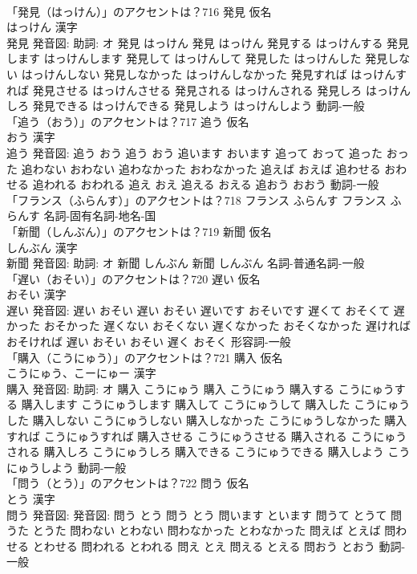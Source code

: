 \documentclass[8pt]{extreport}
\begin{document}
\begin{CJK}{UTF8}{min}
\\	「発見（はっけん）」のアクセントは？716	発見 仮名　
\\	はっけん 漢字　
\\	発見 発音図: 助詞: オ	発見 はっけん		発見 はっけん 発見する はっけんする 発見します はっけんします 発見して はっけんして 発見した はっけんした 発見しない はっけんしない 発見しなかった はっけんしなかった 発見すれば はっけんすれば 発見させる はっけんさせる 発見される はっけんされる 発見しろ はっけんしろ 発見できる はっけんできる 発見しよう はっけんしよう				動詞-一般 
\\	「追う（おう）」のアクセントは？717	追う 仮名　
\\	おう 漢字　
\\	追う 発音図:	追う おう		追う おう 追います おいます 追って おって 追った おった 追わない おわない 追わなかった おわなかった 追えば おえば 追わせる おわせる 追われる おわれる 追え おえ 追える おえる 追おう おおう				動詞-一般 
\\	「フランス（ふらんす）」のアクセントは？718		フランス ふらんす		フランス ふらんす				名詞-固有名詞-地名-国 
\\	「新聞（しんぶん）」のアクセントは？719	新聞 仮名　
\\	しんぶん 漢字　
\\	新聞 発音図: 助詞: オ	新聞 しんぶん		新聞 しんぶん				名詞-普通名詞-一般 
\\	「遅い（おそい）」のアクセントは？720	遅い 仮名　
\\	おそい 漢字　
\\	遅い 発音図:	遅い おそい		遅い おそい 遅いです おそいです 遅くて おそくて 遅かった おそかった 遅くない おそくない 遅くなかった おそくなかった 遅ければ おそければ 遅い おそい おそい 遅く おそく				形容詞-一般 
\\	「購入（こうにゅう）」のアクセントは？721	購入 仮名　
\\	こうにゅう、こーにゅー 漢字　
\\	購入 発音図: 助詞: オ	購入 こうにゅう		購入 こうにゅう 購入する こうにゅうする 購入します こうにゅうします 購入して こうにゅうして 購入した こうにゅうした 購入しない こうにゅうしない 購入しなかった こうにゅうしなかった 購入すれば こうにゅうすれば 購入させる こうにゅうさせる 購入される こうにゅうされる 購入しろ こうにゅうしろ 購入できる こうにゅうできる 購入しよう こうにゅうしよう				動詞-一般 
\\	「問う（とう）」のアクセントは？722	問う 仮名　
\\	とう 漢字　
\\	問う 発音図: 発音図:	問う とう		問う とう 問います といます 問うて とうて 問うた とうた 問わない とわない 問わなかった とわなかった 問えば とえば 問わせる とわせる 問われる とわれる 問え とえ 問える とえる 問おう とおう				動詞-一般 

\end{CJK}
\end{document}

